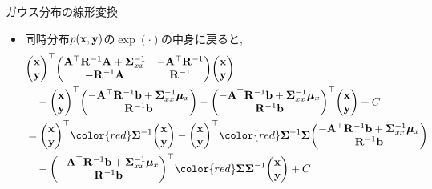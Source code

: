 \documentclass[dvipdfmx,notheorems,t]{beamer}
\begin{document}
\begin{frame}{ガウス分布の線形変換}
\begin{itemize}
  \item 同時分布$p(\vb{x}, \vb{y})$の$\exp(\cdot)$の中身に戻ると,
  {\small \begin{align*}
    & \mqty(\vb{x} \\ \vb{y})^\top
      \mqty(\vb{A}^\top \vb{R}^{-1} \vb{A} + \vb{\Sigma}_{xx}^{-1} & -\vb{A}^\top \vb{R}^{-1} \\
      -\vb{R}^{-1} \vb{A} & \vb{R}^{-1}) \mqty(\vb{x} \\ \vb{y}) \\
    & \quad - \mqty(\vb{x} \\ \vb{y})^\top
      \mqty(-\vb{A}^\top \vb{R}^{-1} \vb{b} + \vb{\Sigma}_{xx}^{-1} \vb*{\mu}_x \\ \vb{R}^{-1} \vb{b})
      - \mqty(-\vb{A}^\top \vb{R}^{-1} \vb{b} + \vb{\Sigma}_{xx}^{-1} \vb*{\mu}_x \\ \vb{R}^{-1} \vb{b})^\top
      \mqty(\vb{x} \\ \vb{y}) + C \\
    &= \mqty(\vb{x} \\ \vb{y})^\top {\color{red} \vb{\Sigma}^{-1}} \mqty(\vb{x} \\ \vb{y})
      - \mqty(\vb{x} \\ \vb{y})^\top {\color{red} \vb{\Sigma}^{-1} \vb{\Sigma}}
      \mqty(-\vb{A}^\top \vb{R}^{-1} \vb{b} + \vb{\Sigma}_{xx}^{-1} \vb*{\mu}_x \\ \vb{R}^{-1} \vb{b}) \\
    & \quad - \mqty(-\vb{A}^\top \vb{R}^{-1} \vb{b} + \vb{\Sigma}_{xx}^{-1} \vb*{\mu}_x \\ \vb{R}^{-1} \vb{b})^\top
      {\color{red} \vb{\Sigma} \vb{\Sigma}^{-1}} \mqty(\vb{x} \\ \vb{y}) + C
  \end{align*}}
\end{itemize}
\end{frame}
\end{document}
